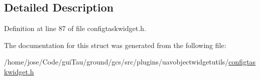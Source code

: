 \subsection{Detailed Description}


Definition at line 87 of file configtaskwidget.\-h.



The documentation for this struct was generated from the following file\-:\begin{DoxyCompactItemize}
\item 
/home/jose/\-Code/gui\-Tau/ground/gcs/src/plugins/uavobjectwidgetutils/\hyperlink{configtaskwidget_8h}{configtaskwidget.\-h}\end{DoxyCompactItemize}
